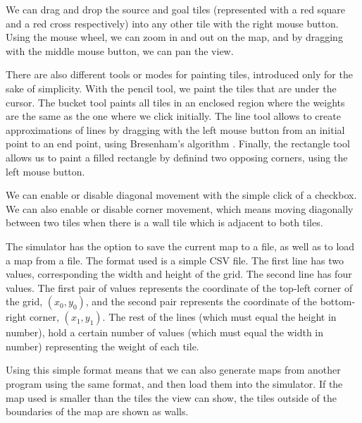 \documentclass[a4paper,10pt]{report}
\begin{document}
We can drag and drop the source and goal tiles (represented with a red square and a red cross respectively) into any other tile with the right mouse button. Using the mouse wheel, we can zoom in and out on the map, and by dragging with the middle mouse button, we can pan the view.

There are also different tools or modes for painting tiles, introduced only for the sake of simplicity. With the pencil tool, we paint the tiles that are under the cursor. The bucket tool paints all tiles in an enclosed region where the weights are the same as the one where we click initially. The line tool allows to create approximations of lines by dragging with the left mouse button from an initial point to an end point, using Bresenham's algorithm \cite{bresenham}. Finally, the rectangle tool allows us to paint a filled rectangle by definind two opposing corners, using the left mouse button.

We can enable or disable diagonal movement with the simple click of a checkbox. We can also enable or disable corner movement, which means moving diagonally between two tiles when there is a wall tile which is adjacent to both tiles.

The simulator has the option to save the current map to a file, as well as to load a map from a file. The format used is a simple CSV file. The first line has two values, corresponding the width and height of the grid. The second line has four values. The first pair of values represents the coordinate of the top-left corner of the grid, $(x_0, y_0)$, and the second pair represents the coordinate of the bottom-right corner, $(x_1, y_1)$. The rest of the lines (which must equal the height in number), hold a certain number of values (which must equal the width in number) representing the weight of each tile.

Using this simple format means that we can also generate maps from another program using the same format, and then load them into the simulator. If the map used is smaller than the tiles the view can show, the tiles outside of the boundaries of the map are shown as walls.
\end{document}
